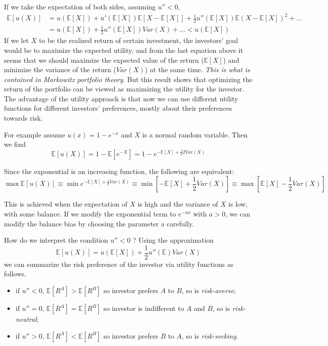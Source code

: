 If we take the expectation of both sides, assuming $u'' < 0$,
\begin{equation*}
  \begin{aligned}
  \mathbb{E}[u(X)] &= u(\mathbb{E}[X]) + u'(\mathbb{E}[X]) \mathbb{E}[X-\mathbb{E}[X]] + \frac{1}{2}u''(\mathbb{E}[X]) \mathbb{E}(X-\mathbb{E}[X])^2 + \ldots\\
  &= u (\mathbb{E}[X]) + \frac{1}{2}u'' (\mathbb{E}[X]) Var(X) + \ldots < u (\mathbb{E}[X])
  \end{aligned}
\end{equation*}
If we let $X$ to be the realized return of certain investment, the investors’ goal would be to maximize the expected utility, and from the last equation above it seems
that we should maximize the expected value of the return ($\mathbb{E}[X]$) and minimize the variance of the return ($Var(X)$) at the same time. \emph{This is what is contained in Markowitz portfolio theory}.
But this result shows that optimizing the return of the portfolio can be viewed as maximizing the utility for the investor. The
advantage of the utility approach is that now we can use different utility functions for different investors’ preferences, mostly about their preferences towards risk.

For example assume $u(x) = 1-e^{-x}$ and $X$ is a normal random variable. Then we find
\begin{equation*}
  \mathbb{E}[u(X)] = 1-\mathbb{E}[e^{-X}] = 1-e^{-\mathbb{E}[X]+ \frac{1}{2}2Var(X)}
\end{equation*}

Since the exponential is an increasing function, the following are equivalent:
\begin{equation*}
  \max \mathbb{E}[u(X)] \equiv \min e^{-\mathbb{E}[X]+ \frac{1}{2}Var(X)} \equiv \min\left[-\mathbb{E}[X] + \frac{1}{2}Var(X)\right] \equiv \max\left[\mathbb{E}[X] - \frac{1}{2}Var(X)\right]
\end{equation*}

This is achieved when the expectation of $X$ is high and the variance of $X$ is low, with some balance. If we modify the exponential term to $e^{-ax}$ with $a > 0$, we can
modify the balance bias by choosing the parameter a carefully.

How do we interpret the condition $u''<0$ ? Using the approximation
\begin{equation*}
  \mathbb{E}[u(X)] = u (\mathbb{E}[X]) + \frac{1}{2}u''(\mathbb{E})Var(X)
\end{equation*}
we can summarize the risk preference of the investor via utility functions as follows.
\begin{itemize}
\item if $u'' < 0$, $\mathbb{E}[R^A] > \mathbb{E}[R^B]$ so investor prefers $A$ to $B$, so is \emph{risk-averse};
\item if $u'' = 0$, $\mathbb{E}[R^A] = \mathbb{E}[R^B]$ so investor is indifferent to $A$ and $B$, so is \emph{risk-neutral};
\item if $u'' > 0$, $\mathbb{E}[R^A] < \mathbb{E}[R^B]$ so investor prefers $B$ to $A$, so is \emph{risk-seeking}.
\end{itemize}

